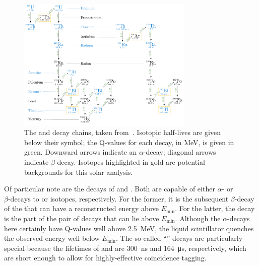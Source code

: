 \begin{figure}
    \centering
    \includegraphics[width=0.75\textwidth]{6_SolarAnalysis/images/U238_Th232_decay_chains_tereza.png}
    \caption[The  and  decay chains.]{The  and  decay chains, taken from~\cite{kroupovaImprovingSensitivityNeutrinoless2020}. %
    Isotopic half-lives are given below their symbol; the Q-values for each decay, in MeV, is given in green. Downward arrows indicate an $\alpha$-decay; diagonal arrows indicate $\beta$-decay. Isotopes highlighted in gold are potential backgrounds for this solar analysis.}
    \label{fig:u_th_decay_chains}
\end{figure}

Of particular note are the decays of  and . Both are capable of either $\alpha\textrm{-}$ or $\beta\textrm{-decays}$ to  or  isotopes, respectively. For the former, it is the subsequent $\beta$-decay of the  that can have a reconstructed energy above $E_{\textrm{min}}$. For the latter, the  decay is the part of the pair of decays that can lie above $E_{\textrm{min}}$. Although the $\alpha$-decays here certainly have Q-values well above \SI{2.5}{\MeV}, the liquid scintillator quenches the observed energy well below $E_{\mathrm{min}}$. The so-called ``'' decays are particularly special because the lifetimes of  and  are \SI{300}{\nano\second} and \SI{164}{\micro\second}, respectively, which are short enough to allow for highly-effective coincidence tagging.

